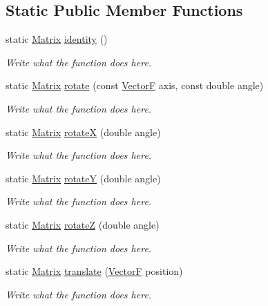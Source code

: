 \subsection*{Static Public Member Functions}
\begin{DoxyCompactItemize}
\item 
static \hyperlink{classMatrix}{Matrix} \hyperlink{classMatrix_ab84e2141cb9aeda01998b21b2c0d0319}{identity} ()
\begin{DoxyCompactList}\small\item\em Write what the function does here. \end{DoxyCompactList}\item 
static \hyperlink{classMatrix}{Matrix} \hyperlink{classMatrix_a5cd82d7b398de86eae8ba93c57630c8a}{rotate} (const \hyperlink{structVectorF}{Vector\+F} axis, const double angle)
\begin{DoxyCompactList}\small\item\em Write what the function does here. \end{DoxyCompactList}\item 
static \hyperlink{classMatrix}{Matrix} \hyperlink{classMatrix_abc63d4009ae96f03ad44545e9d1c3c81}{rotate\+X} (double angle)
\begin{DoxyCompactList}\small\item\em Write what the function does here. \end{DoxyCompactList}\item 
static \hyperlink{classMatrix}{Matrix} \hyperlink{classMatrix_a83ee280c509de4ff036d26e8ed11d52f}{rotate\+Y} (double angle)
\begin{DoxyCompactList}\small\item\em Write what the function does here. \end{DoxyCompactList}\item 
static \hyperlink{classMatrix}{Matrix} \hyperlink{classMatrix_a1b0199d040686543579e52695eb6da14}{rotate\+Z} (double angle)
\begin{DoxyCompactList}\small\item\em Write what the function does here. \end{DoxyCompactList}\item 
static \hyperlink{classMatrix}{Matrix} \hyperlink{classMatrix_adf246c47bce77c3c53b9e804ec475e35}{translate} (\hyperlink{structVectorF}{Vector\+F} position)
\begin{DoxyCompactList}\small\item\em Write what the function does here. \end{DoxyCompactList}\item 

\end{DoxyCompactItemize}
